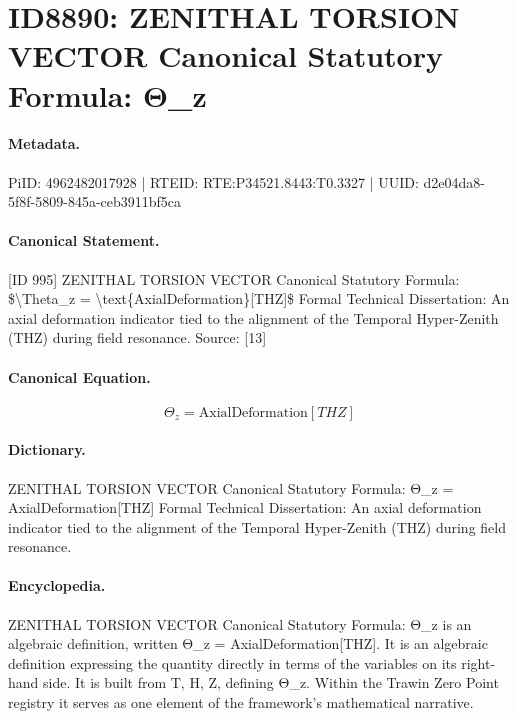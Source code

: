 \section*{ID8890: ZENITHAL TORSION VECTOR Canonical Statutory Formula: Θ\_z}
\paragraph{Metadata.}
PiID: 4962482017928 | RTEID: RTE:P34521.8443:T0.3327 | UUID: d2e04da8-5f8f-5809-845a-ceb3911bf5ca

\paragraph{Canonical Statement.}
[ID 995] ZENITHAL TORSION VECTOR Canonical Statutory Formula: \$\textbackslash{}Theta\_z = \textbackslash{}text\{AxialDeformation\}[THZ]\$ Formal Technical Dissertation: An axial deformation indicator tied to the alignment of the Temporal Hyper-Zenith (THZ) during field resonance. Source: [13]

\paragraph{Canonical Equation.}
\[
\Theta_z = \text{AxialDeformation}[THZ]
\]

\paragraph{Dictionary.}
ZENITHAL TORSION VECTOR Canonical Statutory Formula: Θ\_z = AxialDeformation[THZ] Formal Technical Dissertation: An axial deformation indicator tied to the alignment of the Temporal Hyper-Zenith (THZ) during field resonance.

\paragraph{Encyclopedia.}
ZENITHAL TORSION VECTOR Canonical Statutory Formula: Θ\_z is an algebraic definition, written Θ\_z = AxialDeformation[THZ]. It is an algebraic definition expressing the quantity directly in terms of the variables on its right-hand side. It is built from T, H, Z, defining Θ\_z. Within the Trawin Zero Point registry it serves as one element of the framework's mathematical narrative.

